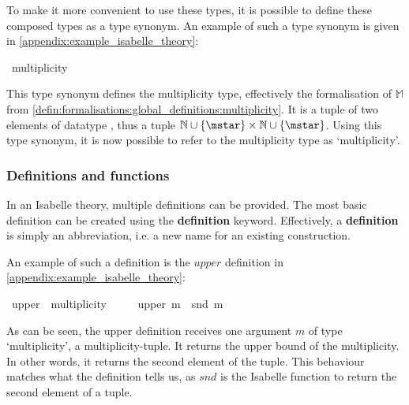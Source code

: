 To make it more convenient to use these types, it is possible to define these composed types as a type synonym. An example of such a type synonym is given in \cref{appendix:example_isabelle_theory}:

\vspace{1em}\begin{isabellebody}
\isamarkupfalse%
\ multiplicity\ {\isacharequal}\ {\isachardoublequoteopen}{\isasymM}\ {\isasymtimes}\ {\isasymM}{\isachardoublequoteclose}
\end{isabellebody}

This type synonym defines the multiplicity type, effectively the formalisation of $\mathbb{M}$ from \cref{defin:formalisations:global_definitions:multiplicity}. It is a tuple of two elements of datatype \isasymM, thus a tuple $\mathbb{N} \cup \{\mstar\} \times \mathbb{N} \cup \{\mstar\}$. Using this type synonym, it is now possible to refer to the multiplicity type as `multiplicity'.

\subsubsection{Definitions and functions}
In an Isabelle theory, multiple definitions can be provided. The most basic definition can be created using the \textbf{definition} keyword. Effectively, a \textbf{definition} is simply an abbreviation, i.e. a new name for an existing construction.

An example of such a definition is the $upper$ definition in \cref{appendix:example_isabelle_theory}:
\vspace{1em}\begin{isabellebody}
\isamarkupfalse%
\ upper\ {\isacharcolon}{\isacharcolon}\ {\isachardoublequoteopen}multiplicity\ {\isasymRightarrow}\ {\isasymM}{\isachardoublequoteclose}\ \isanewline
\ \ {\isachardoublequoteopen}upper\ m\ {\isasymequiv}\ snd\ m{\isachardoublequoteclose}
\end{isabellebody}

As can be seen, the upper definition receives one argument $m$ of type `multiplicity', a multiplicity-tuple. It returns the upper bound of the multiplicity. In other words, it returns the second element of the tuple. This behaviour matches what the definition tells us, as $snd$ is the Isabelle function to return the second element of a tuple.

